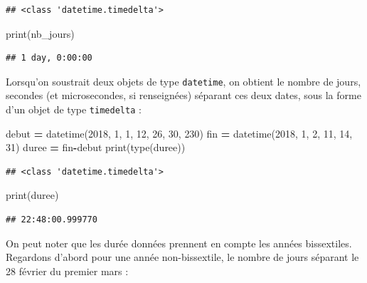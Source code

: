 \documentclass[
  12pt,
]{book}
\newenvironment{Shaded}{\begin{snugshade}}{\end{snugshade}}
\newcommand{\BuiltInTok}[1]{#1}
\newcommand{\DecValTok}[1]{\textcolor[rgb]{0.00,0.00,0.81}{#1}}
\newcommand{\NormalTok}[1]{#1}
\newcommand{\OperatorTok}[1]{\textcolor[rgb]{0.81,0.36,0.00}{\textbf{#1}}}
\numberwithin{equation}{section}
\numberwithin{countremarque}{section}
\begin{document}
\begin{lstlisting}
## <class 'datetime.timedelta'>
\end{lstlisting}

\begin{Shaded}
\begin{Highlighting}[]
\BuiltInTok{print}\NormalTok{(nb\_jours)}
\end{Highlighting}
\end{Shaded}

\begin{lstlisting}
## 1 day, 0:00:00
\end{lstlisting}

Lorsqu'on soustrait deux objets de type \texttt{datetime}, on obtient le nombre de jours, secondes (et microsecondes, si renseignées) séparant ces deux dates, sous la forme d'un objet de type \texttt{timedelta} :

\begin{Shaded}
\begin{Highlighting}[]
\NormalTok{debut }\OperatorTok{=}\NormalTok{ datetime(}\DecValTok{2018}\NormalTok{, }\DecValTok{1}\NormalTok{, }\DecValTok{1}\NormalTok{, }\DecValTok{12}\NormalTok{, }\DecValTok{26}\NormalTok{, }\DecValTok{30}\NormalTok{, }\DecValTok{230}\NormalTok{)}
\NormalTok{fin }\OperatorTok{=}\NormalTok{ datetime(}\DecValTok{2018}\NormalTok{, }\DecValTok{1}\NormalTok{, }\DecValTok{2}\NormalTok{, }\DecValTok{11}\NormalTok{, }\DecValTok{14}\NormalTok{, }\DecValTok{31}\NormalTok{)}
\NormalTok{duree }\OperatorTok{=}\NormalTok{ fin}\OperatorTok{{-}}\NormalTok{debut}
\BuiltInTok{print}\NormalTok{(}\BuiltInTok{type}\NormalTok{(duree))}
\end{Highlighting}
\end{Shaded}

\begin{lstlisting}
## <class 'datetime.timedelta'>
\end{lstlisting}

\begin{Shaded}
\begin{Highlighting}[]
\BuiltInTok{print}\NormalTok{(duree)}
\end{Highlighting}
\end{Shaded}

\begin{lstlisting}
## 22:48:00.999770
\end{lstlisting}

On peut noter que les durée données prennent en compte les années bissextiles. Regardons d'abord pour une année non-bissextile, le nombre de jours séparant le 28 février du premier mars :
\end{document}
